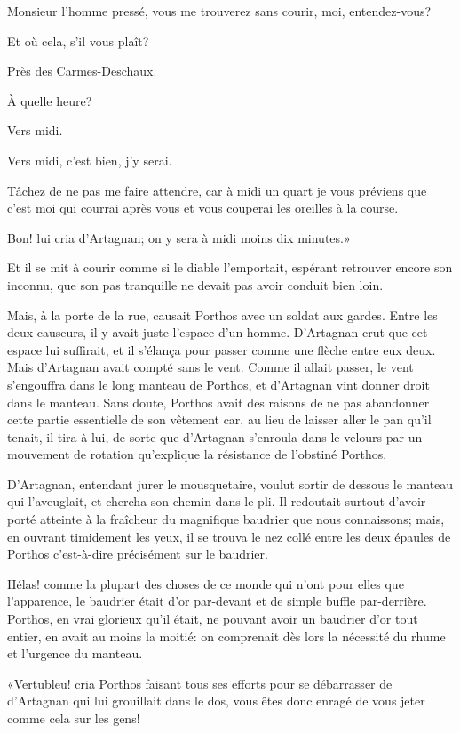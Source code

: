 \speak  Monsieur l'homme pressé, vous me trouverez sans courir, moi, entendez-vous? 

\speak  Et où cela, s'il vous plaît? 

\speak  Près des Carmes-Deschaux. 

\speak  À quelle heure? 

\speak  Vers midi. 

\speak  Vers midi, c'est bien, j'y serai. 

\speak  Tâchez de ne pas me faire attendre, car à midi un quart je vous préviens que c'est moi qui courrai après vous et vous couperai les oreilles à la course. 

\speak  Bon! lui cria d'Artagnan; on y sera à midi moins dix minutes.» 

Et il se mit à courir comme si le diable l'emportait, espérant retrouver encore son inconnu, que son pas tranquille ne devait pas avoir conduit bien loin. 

Mais, à la porte de la rue, causait Porthos avec un soldat aux gardes. Entre les deux causeurs, il y avait juste l'espace d'un homme. D'Artagnan crut que cet espace lui suffirait, et il s'élança pour passer comme une flèche entre eux deux. Mais d'Artagnan avait compté sans le vent. Comme il allait passer, le vent s'engouffra dans le long manteau de Porthos, et d'Artagnan vint donner droit dans le manteau. Sans doute, Porthos avait des raisons de ne pas abandonner cette partie essentielle de son vêtement car, au lieu de laisser aller le pan qu'il tenait, il tira à lui, de sorte que d'Artagnan s'enroula dans le velours par un mouvement de rotation qu'explique la résistance de l'obstiné Porthos. 

D'Artagnan, entendant jurer le mousquetaire, voulut sortir de dessous le manteau qui l'aveuglait, et chercha son chemin dans le pli. Il redoutait surtout d'avoir porté atteinte à la fraîcheur du magnifique baudrier que nous connaissons; mais, en ouvrant timidement les yeux, il se trouva le nez collé entre les deux épaules de Porthos c'est-à-dire précisément sur le baudrier. 

Hélas! comme la plupart des choses de ce monde qui n'ont pour elles que l'apparence, le baudrier était d'or par-devant et de simple buffle par-derrière. Porthos, en vrai glorieux qu'il était, ne pouvant avoir un baudrier d'or tout entier, en avait au moins la moitié: on comprenait dès lors la nécessité du rhume et l'urgence du manteau. 

«Vertubleu! cria Porthos faisant tous ses efforts pour se débarrasser de d'Artagnan qui lui grouillait dans le dos, vous êtes donc enragé de vous jeter comme cela sur les gens! 

